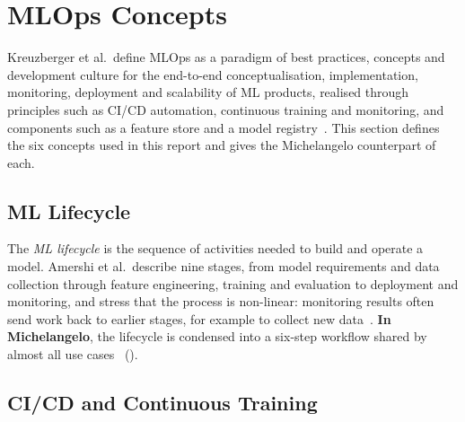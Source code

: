 ﻿%

\section{MLOps Concepts}
\label{sec:mlops-concepts}

Kreuzberger et al.\ define MLOps as a paradigm of best practices,
concepts and development culture for the end-to-end conceptualisation,
implementation, monitoring, deployment and scalability of ML products,
realised through principles such as CI/CD automation, continuous training
and monitoring, and components such as a feature store and a model
registry~\cite{kreuzberger2023mlops}. This section defines the six
concepts used in this report and gives the Michelangelo counterpart of
each.

\subsection{ML Lifecycle}
\label{subsec:ml-lifecycle}

The \emph{ML lifecycle} is the sequence of activities needed to build and
operate a model. Amershi et al.\ describe nine stages, from model
requirements and data collection through feature engineering, training
and evaluation to deployment and monitoring, and stress that the process
is non-linear: monitoring results often send work back to earlier stages,
for example to collect new data~\cite{amershi2019software}.
\textbf{In Michelangelo}, the lifecycle is condensed into a six-step
workflow shared by almost all use cases~\cite{delbalso2017meet}
().

\subsection{CI/CD and Continuous Training}
\label{subsec:cicd-ct}

